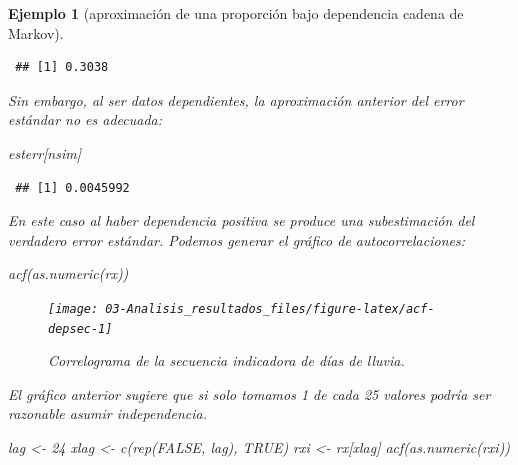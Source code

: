 \documentclass[
  10pt,
]{book}
\newenvironment{Shaded}{\begin{snugshade}}{\end{snugshade}}
\newcommand{\ConstantTok}[1]{\textcolor[rgb]{0.00,0.00,0.00}{#1}}
\newcommand{\DecValTok}[1]{\textcolor[rgb]{0.00,0.00,0.81}{#1}}
\newcommand{\FunctionTok}[1]{\textcolor[rgb]{0.00,0.00,0.00}{#1}}
\newcommand{\NormalTok}[1]{#1}
\newcommand{\OtherTok}[1]{\textcolor[rgb]{0.56,0.35,0.01}{#1}}
\theoremstyle{break}
\newtheorem{example}{Ejemplo}[chapter]
\theoremstyle{nonumberplain}
\begin{document}
\begin{example}[aproximación de una proporción bajo dependencia cadena de Markov]
\begin{verbatim}
 ## [1] 0.3038
\end{verbatim}

Sin embargo, al ser datos dependientes, la aproximación anterior del error estándar no es adecuada:

\begin{Shaded}
\begin{Highlighting}[]
\NormalTok{esterr[nsim]}
\end{Highlighting}
\end{Shaded}

\begin{verbatim}
 ## [1] 0.0045992
\end{verbatim}

En este caso al haber dependencia positiva se produce una subestimación del verdadero error estándar.
Podemos generar el gráfico de autocorrelaciones:

\begin{Shaded}
\begin{Highlighting}[]
\FunctionTok{acf}\NormalTok{(}\FunctionTok{as.numeric}\NormalTok{(rx))}
\end{Highlighting}
\end{Shaded}

\begin{figure}[!htbp]

{\centering \texttt{[image: 03-Analisis\_resultados\_files/figure-latex/acf-depsec-1]} 

}

\caption{Correlograma de la secuencia indicadora de días de lluvia.}\label{fig:acf-depsec}
\end{figure}

El gráfico anterior sugiere que si solo tomamos 1 de cada 25 valores podría ser razonable asumir independencia.

\begin{Shaded}
\begin{Highlighting}[]
\NormalTok{lag }\OtherTok{\textless{}{-}} \DecValTok{24}
\NormalTok{xlag }\OtherTok{\textless{}{-}} \FunctionTok{c}\NormalTok{(}\FunctionTok{rep}\NormalTok{(}\ConstantTok{FALSE}\NormalTok{, lag), }\ConstantTok{TRUE}\NormalTok{)}
\NormalTok{rxi }\OtherTok{\textless{}{-}}\NormalTok{ rx[xlag]}
\FunctionTok{acf}\NormalTok{(}\FunctionTok{as.numeric}\NormalTok{(rxi))}
\end{Highlighting}
\end{Shaded}

\begin{figure}[!htbp]


\end{figure}
\end{example}
\end{document}
